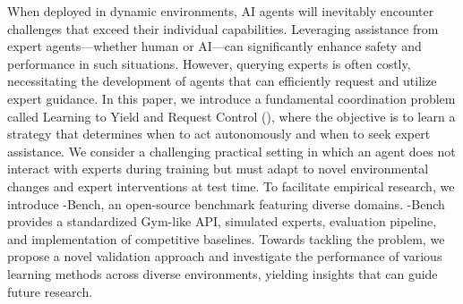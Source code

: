 When deployed in dynamic environments, AI agents will inevitably encounter challenges that exceed their individual capabilities. Leveraging assistance from expert agents—whether human or AI—can significantly enhance safety and performance in such situations. However, querying experts is often costly, necessitating the development of agents that can efficiently request and utilize expert guidance.
In this paper, we introduce a fundamental coordination problem called Learning to Yield and Request Control (\ourMethod), where the objective is to learn a strategy that determines when to act autonomously and when to seek expert assistance. We consider a challenging practical setting in which an agent does not interact with experts during training but must adapt to novel environmental changes and expert interventions at test time.
To facilitate empirical research, we introduce \ourMethod-Bench, an open-source benchmark featuring diverse domains. \ourMethod-Bench provides a standardized Gym-like API, simulated experts, evaluation pipeline, and implementation of competitive baselines. 
Towards tackling the \ourMethod problem, we propose a novel validation approach and investigate the performance of various learning methods across diverse environments, yielding insights that can guide future research.
